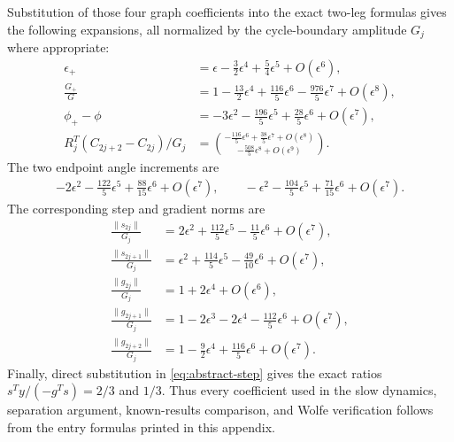 \documentclass[smallextended,envcountsame]{svjour3}
\newcommand{\norm}[1]{\lVert #1\rVert}
\begin{document}
Substitution of those four graph coefficients into the exact two-leg formulas
gives the following expansions, all normalized by the cycle-boundary
amplitude $G_j$ where appropriate:
\begin{align*}
\epsilon_+
 &=\epsilon-\frac32\epsilon^4+\frac54\epsilon^5+O(\epsilon^6),\\
\frac{G_+}{G}
 &=1-\frac{13}{2}\epsilon^4+\frac{116}{5}\epsilon^6
   -\frac{976}{5}\epsilon^7+O(\epsilon^8),\\
\phi_+-\phi
 &=-3\epsilon^2-\frac{196}{5}\epsilon^5
   +\frac{28}{5}\epsilon^6+O(\epsilon^7),\\
R_j^T(C_{2j+2}-C_{2j})/G_j
 &=\binom{-\frac{116}{5}\epsilon^6+\frac{38}{5}\epsilon^7
           +O(\epsilon^8)}
          {-\frac{508}{5}\epsilon^8+O(\epsilon^9)}.
\end{align*}
The two endpoint angle increments are
\begin{align*}
-2\epsilon^2-\frac{122}{5}\epsilon^5
 +\frac{88}{15}\epsilon^6+O(\epsilon^7),\qquad
-\epsilon^2-\frac{104}{5}\epsilon^5
 +\frac{71}{15}\epsilon^6+O(\epsilon^7).
\end{align*}
The corresponding step and gradient norms are
\begin{align*}
\frac{\norm{s_{2j}}}{G_j}
 &=2\epsilon^2+\frac{112}{5}\epsilon^5
   -\frac{11}{5}\epsilon^6+O(\epsilon^7),\\
\frac{\norm{s_{2j+1}}}{G_j}
 &=\epsilon^2+\frac{114}{5}\epsilon^5
   -\frac{49}{10}\epsilon^6+O(\epsilon^7),\\
\frac{\norm{g_{2j}}}{G_j}
 &=1+2\epsilon^4+O(\epsilon^6),\\
\frac{\norm{g_{2j+1}}}{G_j}
 &=1-2\epsilon^3-2\epsilon^4-\frac{112}{5}\epsilon^6
   +O(\epsilon^7),\\
\frac{\norm{g_{2j+2}}}{G_j}
 &=1-\frac92\epsilon^4+\frac{116}{5}\epsilon^6
   +O(\epsilon^7).
\end{align*}
Finally, direct substitution in \eqref{eq:abstract-step} gives the exact
ratios $s^Ty/(-g^Ts)=2/3$ and $1/3$.  Thus every coefficient used in the
slow dynamics, separation argument, known-results comparison, and Wolfe
verification follows from the entry formulas printed in this appendix.
\end{document}
